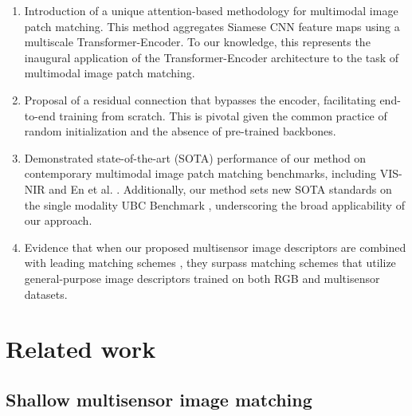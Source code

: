 \documentclass[10pt,journal]{IEEEtran}\usepackage{amsfonts}
\begin{document}
\begin{enumerate}
\item Introduction of a unique attention-based methodology for multimodal
image patch matching. This method aggregates Siamese CNN feature maps using
a multiscale Transformer-Encoder. To our knowledge, this represents the
inaugural application of the Transformer-Encoder architecture to the task of
multimodal image patch matching.

\item Proposal of a residual connection that bypasses the encoder,
facilitating end-to-end training from scratch. This is pivotal given the
common practice of random initialization and the absence of pre-trained
backbones.

\item Demonstrated state-of-the-art (SOTA) performance of our method on
contemporary multimodal image patch matching benchmarks, including VIS-NIR
\cite{SiameseCrossSpectral} and En et al. \cite{Q-net, TS-net}.
Additionally, our method sets new SOTA standards on the single modality UBC
Benchmark \cite{UBC_benchmark}, underscoring the broad applicability of our
approach.

\item Evidence that when our proposed multisensor image descriptors are
combined with leading matching schemes \cite{CoAM,LoFTR,SuperPoint}, they
surpass matching schemes that utilize general-purpose image descriptors
trained on both RGB and multisensor datasets.
\end{enumerate}

\section{Related work}

\subsection{Shallow multisensor image matching}
\end{document}
